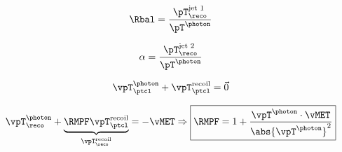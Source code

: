 \begin{frame}[t]
\vspace{\baselineskip}

~\hfill

\hfill~

\pause
\vfill

~\hfill

\hfill\hfill\hfill

\hfill\hfill\hfill

\hfill\hfill\hfill

\hfill~

\end{frame}

\begin{frame}
\begin{minipage}[t]{.45\textwidth}
\begin{equation*}
\Rbal = \frac{\pT_\reco^\text{jet 1}}{\pT^{\photon}}
\end{equation*}
\end{minipage}
\hfill
\begin{minipage}[t]{.45\textwidth}
\begin{equation*}
\alpha = \frac{\pT_\reco^\text{jet 2}}{\pT^{\photon}}
\end{equation*}
\end{minipage}
\end{frame}

\begin{frame}

\begin{equation*}
\vpT^\photon_\ptcl + \vpT^\text{recoil}_\ptcl = \vec{0}
\end{equation*}

\pause
\vfill


\begin{equation*}
\vpT^\photon_\reco + \underbrace{\RMPF \vpT^\text{recoil}_\ptcl}_{\vpT^\text{recoil}_\reco} = -\vMET
\Rightarrow
\boxed{\RMPF = 1 + \frac{\vpT^\photon\cdot\vMET}{\abs{\vpT^\photon}^2}}
\end{equation*}
\end{frame}
